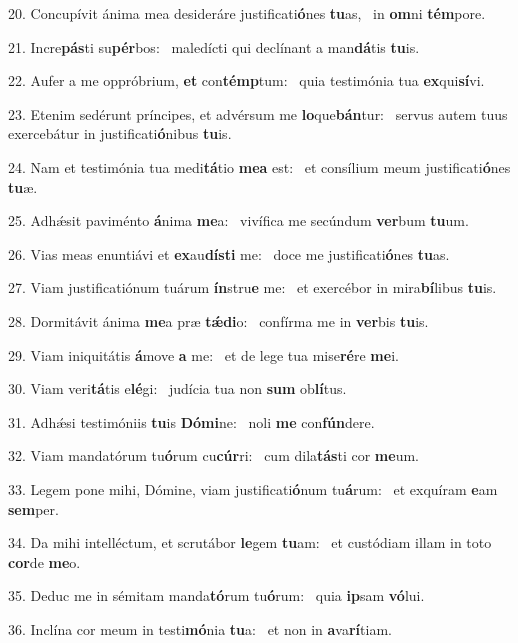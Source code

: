 20. Concupívit ánima mea desideráre justificati\textbf{ó}nes \textbf{tu}as, \ast\  in \textbf{om}ni \textbf{tém}pore.\

21. Incre\textbf{pás}ti su\textbf{pér}bos: \ast\  maledícti qui declínant a man\textbf{dá}tis \textbf{tu}is.\

22. Aufer a me oppróbrium, \textbf{et} con\textbf{témp}tum: \ast\  quia testimónia tua \textbf{ex}qui\textbf{sí}vi.\

23. Etenim sedérunt príncipes, et advérsum me \textbf{lo}que\textbf{bán}tur: \ast\  servus autem tuus exercebátur in justificati\textbf{ó}nibus \textbf{tu}is.\

24. Nam et testimónia tua medi\textbf{tá}tio \textbf{me}\textbf{a} est: \ast\  et consílium meum justificati\textbf{ó}nes \textbf{tu}æ.\

25. Adhǽsit paviménto \textbf{á}nima \textbf{me}a: \ast\  vivífica me secúndum \textbf{ver}bum \textbf{tu}um.\

26. Vias meas enuntiávi et \textbf{ex}au\textbf{dís}\textbf{ti} me: \ast\  doce me justificati\textbf{ó}nes \textbf{tu}as.\

27. Viam justificatiónum tuárum \textbf{ín}stru\textbf{e} me: \ast\  et exercébor in mira\textbf{bí}libus \textbf{tu}is.\

28. Dormitávit ánima \textbf{me}a præ \textbf{tǽ}\textbf{di}o: \ast\  confírma me in \textbf{ver}bis \textbf{tu}is.\

29. Viam iniquitátis \textbf{á}move \textbf{a} me: \ast\  et de lege tua mise\textbf{ré}re \textbf{me}i.\

30. Viam veri\textbf{tá}tis e\textbf{lé}gi: \ast\  judícia tua non \textbf{sum} ob\textbf{lí}tus.\

31. Adhǽsi testimóniis \textbf{tu}is \textbf{Dó}\textbf{mi}ne: \ast\  noli \textbf{me} con\textbf{fún}dere.\

32. Viam mandatórum tu\textbf{ó}rum cu\textbf{cúr}ri: \ast\  cum dila\textbf{tás}ti cor \textbf{me}um.\

33. Legem pone mihi, Dómine, viam justificati\textbf{ó}num tu\textbf{á}rum: \ast\  et exquíram \textbf{e}am \textbf{sem}per.\

34. Da mihi intelléctum, et scrutábor \textbf{le}gem \textbf{tu}am: \ast\  et custódiam illam in toto \textbf{cor}de \textbf{me}o.\

35. Deduc me in sémitam manda\textbf{tó}rum tu\textbf{ó}rum: \ast\  quia \textbf{ip}sam \textbf{vó}lui.\

36. Inclína cor meum in testi\textbf{mó}nia \textbf{tu}a: \ast\  et non in \textbf{a}va\textbf{rí}tiam.\

